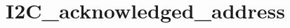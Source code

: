 \hypertarget{group___i2_c__acknowledged__address}{\section{I2\-C\-\_\-acknowledged\-\_\-address}
\label{group___i2_c__acknowledged__address}
}

